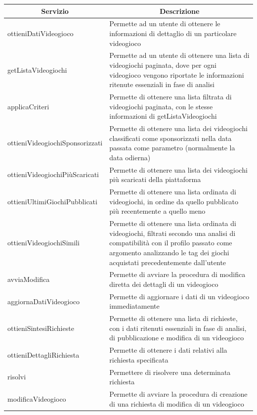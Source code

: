 \begin{center}
	\begin{tabular}{||l | p{20em}||} 
	\hline
	\multicolumn{1}{||c|}{\textbf{Servizio}} & \multicolumn{1}{c||}{\textbf{Descrizione}} \\
	\hline\hline
	ottieniDatiVideogioco & Permette ad un utente di ottenere le informazioni di dettaglio di un particolare videogioco \\ 
	\hline
	getListaVideogiochi & Permette ad un utente di ottenere una lista di videogiochi paginata, dove per ogni videogioco vengono riportate le informazioni ritenute essenziali in fase di analisi \\
	\hline
	applicaCriteri & Permette di ottenere una lista filtrata di videogiochi paginata, con le stesse informazioni di getListaVideogiochi \\
	\hline
	ottieniVideogiochiSponsorizzati & Permette di ottenere una lista dei videogiochi classificati come sponsorizzati nella data passata come parametro (normalmente la data odierna) \\
	\hline
	ottieniVideogiochiPiùScaricati & Permette di ottenere una lista dei videogiochi più scaricati della piattaforma \\
	\hline
	ottieniUltimiGiochiPubblicati & Permette di ottenere una lista ordinata di videogiochi, in ordine da quello pubblicato più recentemente a quello meno \\
	\hline
	ottieniVideogiochiSimili & Permette di ottenere una lista ordinata di videogiochi, filtrati secondo una analisi di compatibilità con il profilo passato come argomento analizzando le tag dei giochi acquistati precedentemente dall’utente \\
	\hline
	avviaModifica & Permette di avviare la procedura di modifica diretta dei dettagli di un videogioco \\
	\hline
	aggiornaDatiVideogioco & Permette di aggiornare i dati di un videogioco immediatamente \\
	\hline
	ottieniSintesiRichieste & Permette di ottenere una lista di richieste, con i dati ritenuti essenziali in fase di analisi, di pubblicazione e modifica di un videogioco \\
	\hline
	ottieniDettagliRichiesta & Permette di ottenere i dati relativi alla richiesta specificata \\
	\hline
	risolvi & Permettere di risolvere una determinata richiesta \\
	\hline
	modificaVideogioco & Permette di avviare la procedura di creazione di una richiesta di modifica di un videogioco \\
	\hline
\end{tabular}
\end{center}

